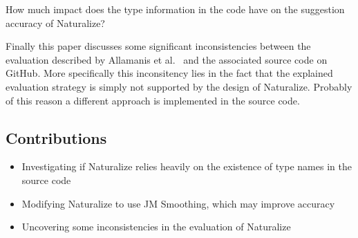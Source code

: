 \begin{resquest} \label{hyp:typeommitance}
How much impact does the type information in the code have on the suggestion accuracy of Naturalize?
\end{resquest}

Finally this paper discusses some significant inconsistencies between the evaluation described by Allamanis et al.~\cite{naturalize} and the associated source code on GitHub. More specifically this inconsitency lies in the fact that the explained evaluation strategy is simply not supported by the design of Naturalize. Probably of this reason a different approach is implemented in the source code.

\subsection{Contributions}
\begin{itemize}
    \item Investigating if Naturalize relies heavily on the existence of type names in the source code
    \item Modifying Naturalize to use JM Smoothing, which may improve accuracy
    \item Uncovering some inconsistencies in the evaluation of Naturalize
\end{itemize}